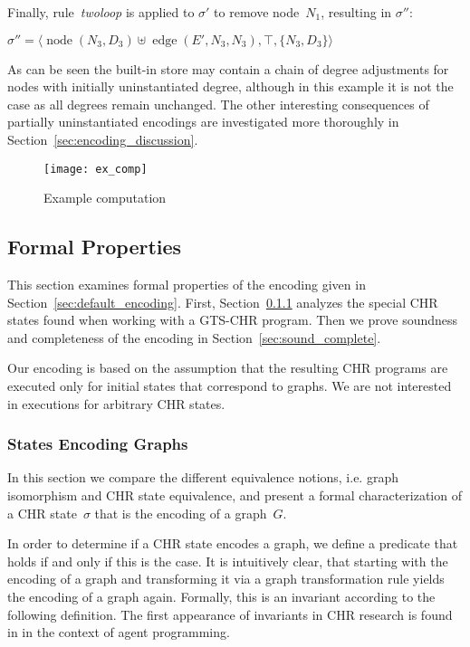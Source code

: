 \documentclass{tlp}
\newcommand{\st}[3]{\ensuremath{\langle #1 , #2 , #3 \rangle}}
\DeclareMathOperator{\node}{node}
\DeclareMathOperator{\edge}{edge}
\begin{document}
Finally, rule~\emph{twoloop} is applied to $\sigma'$ to remove node~$N_1$,
resulting in $\sigma''$:

$\sigma'' = \st{\node(N_3, D_3) \uplus \edge(E', N_3, N_3)}{\top}{\{N_3, D_3\}}$

As can be seen the built-in store may contain a chain of degree adjustments for
nodes with initially uninstantiated degree, although in this example it is not
the case as all degrees remain unchanged. The other interesting consequences of
partially uninstantiated encodings are investigated more thoroughly in
Section~\ref{sec:encoding_discussion}.

\begin{figure}
\texttt{[image: ex\_comp]}
\caption{Example computation} 
\label{fig:ex_comp}
\end{figure}

\subsection{Formal Properties}
\label{sec:properties}

This section examines formal properties of the encoding given in
Section~\ref{sec:default_encoding}. First, Section~\ref{sec:graph_states}
analyzes the special CHR states found when working with a GTS-CHR program. Then
we prove soundness and completeness of the encoding in
Section~\ref{sec:sound_complete}.

Our encoding is based on the assumption that the resulting CHR programs are
executed only for initial states that correspond to graphs. We are not interested
in executions for arbitrary CHR states.

\subsubsection{States Encoding Graphs}
\label{sec:graph_states}

In this section we compare the different equivalence notions, i.e. graph
isomorphism and CHR state equivalence, and present a formal characterization of a
CHR state~$\sigma$ that is the encoding of a graph~$G$.

In order to determine if a CHR state encodes a graph, we define a predicate that
holds if and only if this is the case. It is intuitively clear, that starting
with the encoding of a graph and transforming it via a graph transformation rule
yields the encoding of a graph again. Formally, this is an invariant according to
the following definition. The first appearance of invariants in CHR research is
found in \cite{lam_sulz_linear_logic_agents_chr06} in the context of agent
programming.
\end{document}
